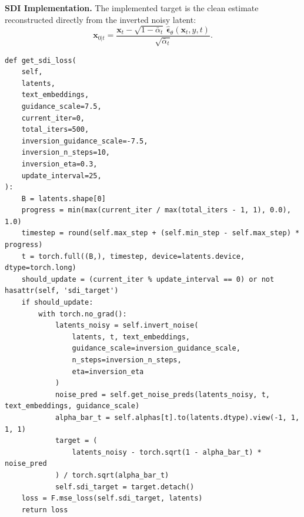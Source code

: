 \noindent\textbf{SDI Implementation.}
The implemented target is the clean estimate reconstructed directly from the inverted noisy latent:
\begin{equation}
 \mathbf{x}_{0|t}
 =\frac{\mathbf{x}_t-\sqrt{1-\bar\alpha_t}\,
         \hat{\boldsymbol{\epsilon}}_\theta(\mathbf{x}_t,y,t)}
        {\sqrt{\bar\alpha_t}}.
 \label{eq:sdi_target}
\end{equation}

\begin{lstlisting}
def get_sdi_loss(
    self,
    latents,
    text_embeddings,
    guidance_scale=7.5,
    current_iter=0,
    total_iters=500,
    inversion_guidance_scale=-7.5,
    inversion_n_steps=10,
    inversion_eta=0.3,
    update_interval=25,
):
    B = latents.shape[0]
    progress = min(max(current_iter / max(total_iters - 1, 1), 0.0), 1.0)
    timestep = round(self.max_step + (self.min_step - self.max_step) * progress)
    t = torch.full((B,), timestep, device=latents.device, dtype=torch.long)
    should_update = (current_iter % update_interval == 0) or not hasattr(self, 'sdi_target')
    if should_update:
        with torch.no_grad():
            latents_noisy = self.invert_noise(
                latents, t, text_embeddings,
                guidance_scale=inversion_guidance_scale,
                n_steps=inversion_n_steps,
                eta=inversion_eta
            )
            noise_pred = self.get_noise_preds(latents_noisy, t, text_embeddings, guidance_scale)
            alpha_bar_t = self.alphas[t].to(latents.dtype).view(-1, 1, 1, 1)
            target = (
                latents_noisy - torch.sqrt(1 - alpha_bar_t) * noise_pred
            ) / torch.sqrt(alpha_bar_t)
            self.sdi_target = target.detach()
    loss = F.mse_loss(self.sdi_target, latents)
    return loss
\end{lstlisting}
